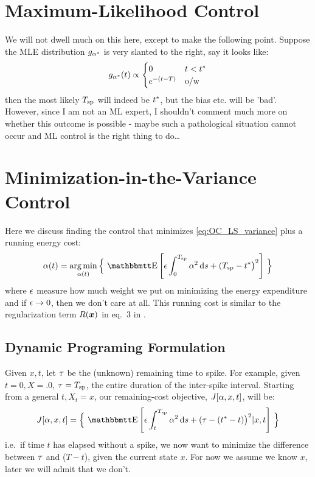 \documentclass{article}
\begin{document}
\section{Maximum-Likelihood Control}
We will not dwell much on this here, except to make the following point. Suppose
the MLE distribution $g_{{\alpha}^*}$ is very slanted to the right, say it looks like:
\begin{equation}
g_{{\alpha}^*}(t) \propto 
\begin{cases}
0 & t < { t^* }
\\
e^{-(t-T)}&  { \textrm{o/w } }
\end{cases}
\end{equation}
then the most likely ${ T_{\textrm{sp} } }$ will indeed be ${ t^* }$, but the bias etc. will be 'bad'.
However, since I am not an ML expert, I shouldn't comment much
more on whether this outcome is possible - maybe such a pathological situation
cannot occur and ML control is the right thing to do\ldots

\section{Minimization-in-the-Variance Control}
Here we discuss finding the control that minimizes \cref{eq:OC_LS_variance} plus
a running energy cost:
\begin{equation}
\a(t) = \argmin_{\a(t)} \Big\{ \,
\Exp\left[
\e \int_0^\ts  \a^2 \intd{s}
+  
(\ts - \T \big)^2 \right]  \, \Big\}
\label{eq:OC_LS_variance_energy}   
\end{equation}
where ${\epsilon}$ measure how much weight we put on minimizing the energy expenditure
and if ${\epsilon} \rightarrow 0$, then we don't care at all. This running cost is
similar to the regularization term $R({ \boldsymbol{x} })$ in eq.\ 3 in \cite{Ahmadian2011}.

\subsection{Dynamic Programing Formulation}
Given $x,t$, let ${\tau}$ be the (unknown) remaining time to spike. For example,
given $t=0, X=.0$, ${\tau} = { T_{\textrm{sp} } }$, the entire duration of the inter-spike interval.
Starting from a general $t, X_t=x$, our remaining-cost objective, $J[{\alpha}, x,t]$,
will be:
\begin{equation}
J[\a, x,t]  = \Big\{ \,
\Exp\left[
\e \int_t^\ts  \a^2 \intd{s}
+
(\t - (\T-t) \big)^2 |x,t
\right] \, \Big\}
\label{eq:OC_LS_mean_objective}   
\end{equation}
i.e.\ if time $t$ has elapsed without a spike, we now want to minimize
the difference between ${\tau}$ and ($T-t$), given the current state $x$. For now we
assume we know $x$, later we will admit that we don't. 
\end{document}
